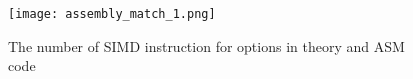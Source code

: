 
\begin{figure}[t]
    \centerline{\texttt{[image: assembly\_match\_1.png]}}
    \caption{The number of SIMD instruction for options in theory and ASM code}
    \label{fig:assembly_match}
\end{figure}

